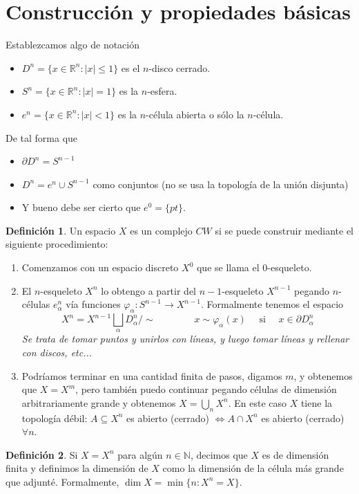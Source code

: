 \documentclass[spanish]{book}
\theoremstyle{definition}
\newtheorem*{defn}{Definición}
\begin{document}
\section{Construcción y propiedades básicas}
	Establezcamos algo de notación
	\begin{itemize}
		\item $D^n=\{x\in\mathbb R^n:|x|\leq1\}$ es el $n$-disco cerrado.
		\item $S^n=\{x\in\mathbb R^n:|x|=1\}$ es la $n$-esfera.
		\item $e^n=\{x\in\mathbb R^n:|x|<1\}$ es la $n$-célula abierta o sólo la $n$-célula.
	\end{itemize}
	De tal forma que
	\begin{itemize}
		\item $\partial D^n=S^{n-1}$
		\item $D^n=e^n\cup S^{n-1}$ como conjuntos (no se usa la topología de la unión disjunta)
		\item Y bueno debe ser cierto que $e^0=\{pt\}$.
	\end{itemize}
	\begin{defn}
		Un espacio $X$ es un complejo $CW$ si se puede construir mediante el siguiente procedimiento:
		\begin{enumerate}
			\item Comenzamos con un espacio discreto $X^0$ que se llama el 0-esqueleto.
			\item El $n$-esqueleto $X^n$ lo obtengo a partir del $n-1$-esqueleto $X^{n-1}$ pegando $n$-células $e^n_\alpha$ vía funciones $\varphi_\alpha:S^{n-1}\to X^{n-1}$. Formalmente tenemos el espacio
			\[X^n=X^{n-1}\bigsqcup_\alpha D_\alpha^n\Big/\sim\qquad\qquad x\sim\varphi_\alpha(x)\quad\text{ si }\quad x\in\partial D^n_\alpha\]
			\textit{Se trata de tomar puntos y unirlos con líneas, y luego tomar líneas y rellenar con discos, etc...}
			\item Podríamos terminar en una cantidad finita de pasos, digamos $m$, y obtenemos que $X=X^m$, pero también puedo continuar pegando células de dimensión arbitrariamente grande y obtenemos $X=\bigcup_n X^n$. En este caso $X$ tiene la topología débil: $A\subseteq X^n$ es abierto (cerrado) $\iff A\cap X^n$ es abierto (cerrado) $\forall n$.
		\end{enumerate}
	\end{defn}
	\begin{defn}
		Si $X=X^n$ para algún $n\in\mathbb N$, decimos que $X$ es de dimensión finita y definimos la dimensión de $X$ como la dimensión de la célula más grande que adjunté. Formalmente, $\dim X=\min \{n:X^n=X\}$.
	\end{defn}
\end{document}
